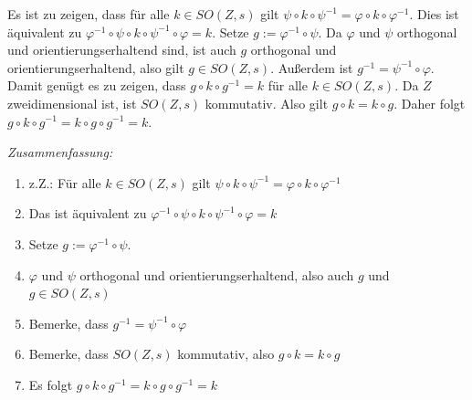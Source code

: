 Es ist zu zeigen, dass für alle \(k\in SO(Z,s)\) gilt
$
\psi\circ k\circ \psi^{-1}
=
\varphi\circ k\circ \varphi^{-1}.
$
Dies ist äquivalent zu
$
\varphi^{-1}\circ \psi\circ k\circ \psi^{-1}\circ \varphi
=
k.
$
Setze $g:=\varphi^{-1}\circ \psi.$
Da \(\varphi\) und \(\psi\) orthogonal und orientierungserhaltend sind, ist auch
\(g\) orthogonal und orientierungserhaltend, also gilt $g\in SO(Z,s)$.
Au\ss erdem ist
$g^{-1}=\psi^{-1}\circ \varphi.$
Damit genügt es zu zeigen, dass
$g\circ k\circ g^{-1}=k$
für alle \(k\in SO(Z,s)\).
Da \(Z\) zweidimensional ist, ist \(SO(Z,s)\) kommutativ. Also gilt
$g\circ k=k\circ g.$
Daher folgt
$
g\circ k\circ g^{-1}
=
k\circ g\circ g^{-1}
=
k.
$

\textit{Zusammenfassung:}
\begin{enumerate}
    \item z.Z.: Für alle \(k\in SO(Z,s)\) gilt $\psi\circ k\circ \psi^{-1}=\varphi\circ k\circ \varphi^{-1}$
    \item Das ist äquivalent zu $\varphi^{-1}\circ \psi\circ k\circ \psi^{-1}\circ \varphi=k$
    \item Setze $g :=\varphi^{-1}\circ \psi$. 
    \item \(\varphi\) und \(\psi\) orthogonal und orientierungserhaltend, also auch $g$ und $g \in SO(Z,s)$
    \item Bemerke, dass $g^{-1}=\psi^{-1}\circ \varphi$
    \item Bemerke, dass $SO(Z,s)$ kommutativ, also $g\circ k=k\circ g$
    \item Es folgt $g\circ k\circ g^{-1}=k\circ g\circ g^{-1}=k$
\end{enumerate}